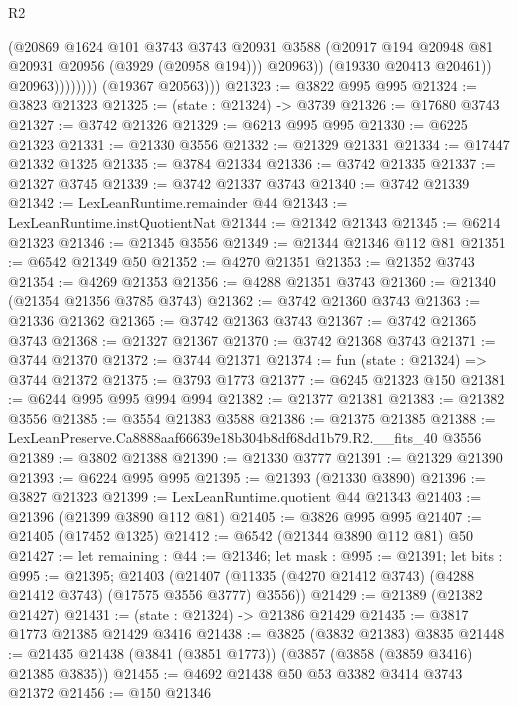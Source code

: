 \begin{lexlean}{R2}
\begin{coremodule}
                            (@20869
                              @1624
                              @101
                              @3743
                              @3743
                              @20931
                              @3588
                              (@20917 @194 @20948 @81 @20931 @20956 (@3929 (@20958 @194)))
                              @20963))
                          (@19330 @20413 @20461))
                        @20963))))))))
        (@19367 @20563)))
@21323 := @3822 @995 @995
@21324 := @3823 @21323
@21325 := (state : @21324) -> @3739
@21326 := @17680 @3743
@21327 := @3742 @21326
@21329 := @6213 @995 @995
@21330 := @6225 @21323
@21331 := @21330 @3556
@21332 := @21329 @21331
@21334 := @17447 @21332 @1325
@21335 := @3784 @21334
@21336 := @3742 @21335
@21337 := @21327 @3745
@21339 := @3742 @21337 @3743
@21340 := @3742 @21339
@21342 := LexLeanRuntime.remainder @44
@21343 := LexLeanRuntime.instQuotientNat
@21344 := @21342 @21343
@21345 := @6214 @21323
@21346 := @21345 @3556
@21349 := @21344 @21346 @112 @81
@21351 := @6542 @21349 @50
@21352 := @4270 @21351
@21353 := @21352 @3743
@21354 := @4269 @21353
@21356 := @4288 @21351 @3743
@21360 := @21340 (@21354 @21356 @3785 @3743)
@21362 := @3742 @21360 @3743
@21363 := @21336 @21362
@21365 := @3742 @21363 @3743
@21367 := @3742 @21365 @3743
@21368 := @21327 @21367
@21370 := @3742 @21368 @3743
@21371 := @3744 @21370
@21372 := @3744 @21371
@21374 := fun (state : @21324) => @3744 @21372
@21375 := @3793 @1773
@21377 := @6245 @21323 @150
@21381 := @6244 @995 @995 @994 @994
@21382 := @21377 @21381
@21383 := @21382 @3556
@21385 := @3554 @21383 @3588
@21386 := @21375 @21385
@21388 := LexLeanPreserve.Ca8888aaf66639e18b304b8df68dd1b79.R2.__fits_40 @3556
@21389 := @3802 @21388
@21390 := @21330 @3777
@21391 := @21329 @21390
@21393 := @6224 @995 @995
@21395 := @21393 (@21330 @3890)
@21396 := @3827 @21323
@21399 := LexLeanRuntime.quotient @44 @21343
@21403 := @21396 (@21399 @3890 @112 @81)
@21405 := @3826 @995 @995
@21407 := @21405 (@17452 @1325)
@21412 := @6542 (@21344 @3890 @112 @81) @50
@21427 := let remaining : @44 := @21346;
  let mask : @995 := @21391;
  let bits : @995 := @21395;
  @21403 (@21407 (@11335 (@4270 @21412 @3743) (@4288 @21412 @3743) (@17575 @3556 @3777) @3556))
@21429 := @21389 (@21382 @21427)
@21431 := (state : @21324) -> @21386 @21429
@21435 := @3817 @1773 @21385 @21429 @3416
@21438 := @3825 (@3832 @21383) @3835
@21448 := @21435 @21438 (@3841 (@3851 @1773)) (@3857 (@3858 (@3859 @3416) @21385 @3835))
@21455 := @4692 @21438 @50 @53 @3382 @3414 @3743 @21372
@21456 := @150 @21346

\end{coremodule}
\end{lexlean}
